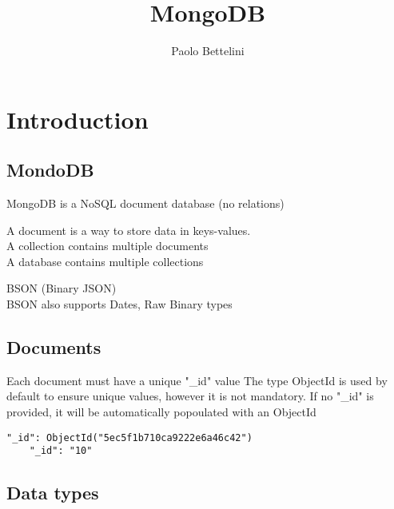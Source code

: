 \documentclass{article}
\title{MongoDB}
\author{Paolo Bettelini}
\date{}
\begin{document}
\maketitle
\tableofcontents
\pagebreak

\section{Introduction}

\subsection{MondoDB}

MongoDB is a NoSQL document database (no relations)

A document is a way to store data in keys-values.
\\
A collection contains multiple documents
\\
A database contains multiple collections

BSON (Binary JSON)
\\
BSON also supports Dates, Raw Binary types

\subsection{Documents}

Each document must have a unique "\_id" value
The type ObjectId is used by default to ensure unique values,
however it is not mandatory.
If no "\_id" is provided, it will be automatically popoulated with an ObjectId

\begin{lstlisting}[style=js]
    "_id": ObjectId("5ec5f1b710ca9222e6a46c42")
    "_id": "10"
\end{lstlisting}

\subsection{Data types}
\end{document}
